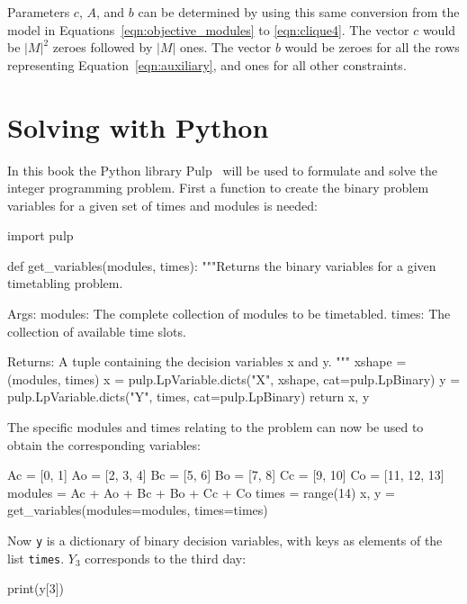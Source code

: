 Parameters \(c\), \(A\), and \(b\) can be determined by using this same conversion
from the model in Equations~\ref{eqn:objective_modules} to \ref{eqn:clique4}.
The vector \(c\) would be \(|M|^2\) zeroes followed by \(|M|\) ones.
The vector \(b\) would be zeroes for all the rows representing
Equation~\ref{eqn:auxiliary}, and ones for all other constraints.

\section{Solving with Python}\label{sec:linear_programming_solving-with-python}

In this book the Python library Pulp~\cite{mitchell2011pulp} will be used to
formulate and solve the integer programming problem. First a function to create the
binary problem variables for a given set of times and modules is needed:

\begin{pyin}
import pulp


def get_variables(modules, times):
    """Returns the binary variables for a given timetabling
    problem.

    Args:
        modules: The complete collection of modules to be
                 timetabled.
        times: The collection of available time slots.

    Returns:
        A tuple containing the decision variables x and y.
    """
    xshape = (modules, times)
    x = pulp.LpVariable.dicts("X", xshape, cat=pulp.LpBinary)
    y = pulp.LpVariable.dicts("Y", times, cat=pulp.LpBinary)
    return x, y
\end{pyin}

The specific modules and times relating to the problem can now be used to
obtain the corresponding variables:

\begin{pyin}
Ac = [0, 1]
Ao = [2, 3, 4]
Bc = [5, 6]
Bo = [7, 8]
Cc = [9, 10]
Co = [11, 12, 13]
modules = Ac + Ao + Bc + Bo + Cc + Co
times = range(14)
x, y = get_variables(modules=modules, times=times)
\end{pyin}

Now \texttt{y} is a dictionary of binary decision variables, with
keys as elements of the list \texttt{times}. \(Y_3\) corresponds to
the third day:

\begin{pyin}
print(y[3])
\end{pyin}

